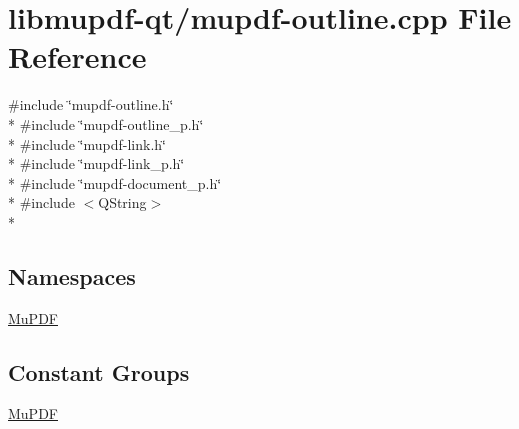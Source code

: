 \hypertarget{mupdf-outline_8cpp}{\section{libmupdf-\/qt/mupdf-\/outline.cpp File Reference}
\label{mupdf-outline_8cpp}
}
{\ttfamily \#include \char`\"{}mupdf-\/outline.\-h\char`\"{}}\\*
{\ttfamily \#include \char`\"{}mupdf-\/outline\-\_\-p.\-h\char`\"{}}\\*
{\ttfamily \#include \char`\"{}mupdf-\/link.\-h\char`\"{}}\\*
{\ttfamily \#include \char`\"{}mupdf-\/link\-\_\-p.\-h\char`\"{}}\\*
{\ttfamily \#include \char`\"{}mupdf-\/document\-\_\-p.\-h\char`\"{}}\\*
{\ttfamily \#include $<$Q\-String$>$}\\*
\subsection*{Namespaces}
\begin{DoxyCompactItemize}
\item 
\hyperlink{namespace_mu_p_d_f}{Mu\-P\-D\-F}
\end{DoxyCompactItemize}
\subsection*{Constant Groups}
\begin{DoxyCompactItemize}
\item 
\hyperlink{namespace_mu_p_d_f}{Mu\-P\-D\-F}
\end{DoxyCompactItemize}
